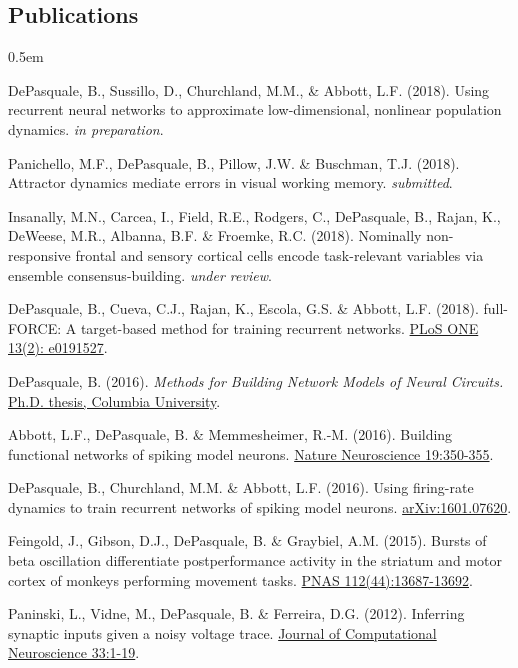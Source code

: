 \documentclass[margin, 10pt]{res}
\begin{document}
\begin{resume}
\section{\textnormal\bf{Publications}} 

\begin{enumerate}[label={[\arabic*]}]
\itemsep0.5em 
\item DePasquale, B., Sussillo, D., Churchland, M.M., \& Abbott, L.F. (2018). Using recurrent neural networks to approximate low-dimensional, nonlinear population dynamics. \emph{in preparation}.
\item Panichello, M.F., DePasquale, B., Pillow, J.W. \& Buschman, T.J. (2018). Attractor dynamics mediate errors in visual working memory. \emph{submitted}.
\item Insanally, M.N., Carcea, I., Field, R.E., Rodgers, C., DePasquale, B., Rajan, K., DeWeese, M.R., Albanna, B.F. \& Froemke, R.C. (2018). Nominally non-responsive frontal and sensory cortical cells encode task-relevant variables via ensemble consensus-building. \emph{under review}.
\item DePasquale, B., Cueva, C.J., Rajan, K., Escola, G.S. \& Abbott, L.F. (2018). full-FORCE: A target-based method for training recurrent networks. \href{http://journals.plos.org/plosone/article?id=10.1371/journal.pone.0191527}{PLoS ONE 13(2): e0191527}.
\item DePasquale, B. (2016). \emph{Methods for Building Network Models of Neural Circuits.} \href{http://dx.doi.org/10.7916/D8W09600}{Ph.D. thesis, Columbia University}.
\item Abbott, L.F., DePasquale, B. \& Memmesheimer, R.-M. (2016). Building functional networks of spiking model neurons. \href{http://www.nature.com/neuro/journal/v19/n3/full/nn.4241.html}{Nature Neuroscience 19:350-355}.
\item DePasquale, B., Churchland, M.M. \& Abbott, L.F. (2016). Using firing-rate dynamics to train recurrent networks of spiking model neurons. \href{http://arxiv.org/abs/1601.07620} {arXiv:1601.07620}.
\item Feingold, J., Gibson, D.J., DePasquale, B. \& Graybiel, A.M. (2015). Bursts of beta oscillation differentiate postperformance activity in the striatum and motor cortex of monkeys performing movement tasks. \href{http://www.pnas.org/content/112/44/13687.long}{PNAS 112(44):13687-13692}.
\item Paninski, L., Vidne, M., DePasquale, B. \& Ferreira, D.G. (2012). Inferring synaptic inputs given a noisy voltage trace. \href{http://link.springer.com/article/10.1007\%2Fs10827-011-0371-7}{Journal of Computational Neuroscience 33:1-19}.
\end{enumerate}


\end{resume}
\end{document}
